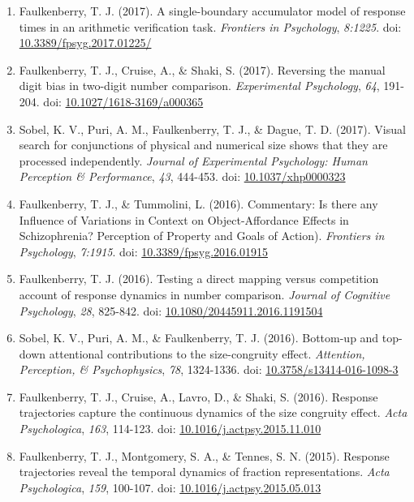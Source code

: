 \documentclass[article,10pt]{article}
\begin{document}
\begin{enumerate}
\item Faulkenberry, T. J. (2017). A single-boundary accumulator model of response times in an arithmetic verification task. \emph{Frontiers in Psychology}, \emph{8:1225}. doi: \href{http://dx.doi.org/10.3389/fpsyg.2017.01225}{10.3389/fpsyg.2017.01225/}
\item Faulkenberry, T. J., Cruise, A., \& Shaki, S. (2017). Reversing the manual digit bias in two-digit number comparison. \emph{Experimental Psychology}, \emph{64}, 191-204.  doi: \href{http://dx.doi.org/10.1027/1618-3169/a000365}{10.1027/1618-3169/a000365}
\item Sobel, K. V., Puri, A. M., Faulkenberry, T. J., \& Dague, T. D. (2017). Visual search for conjunctions of physical and numerical size shows that they are processed independently. \emph{Journal of Experimental Psychology: Human Perception \& Performance}, \emph{43}, 444-453. doi: \href{http://dx.doi.org/10.1037/xhp0000323}{10.1037/xhp0000323}
\item Faulkenberry, T. J., \& Tummolini, L. (2016). Commentary: Is there any Influence of Variations in Context on Object-Affordance Effects in Schizophrenia? Perception of Property and Goals of Action). \emph{Frontiers in Psychology}, \emph{7:1915}. doi: \href{http://dx.doi.org/10.3389/fpsyg.2016.01915}{10.3389/fpsyg.2016.01915}
\item Faulkenberry, T. J. (2016). Testing a direct mapping versus competition account of response dynamics in number comparison. \emph{Journal of Cognitive Psychology}, \emph{28}, 825-842. doi: \href{http://dx.doi.org/10.1080/20445911.2016.1191504}{10.1080/20445911.2016.1191504}
\item Sobel, K. V., Puri, A. M., \& Faulkenberry, T. J. (2016). Bottom-up and top-down attentional contributions to the size-congruity effect. \emph{Attention, Perception, \& Psychophysics}, \emph{78}, 1324-1336. doi: \href{http://dx.doi.org/10.3758/s13414-016-1098-3}{10.3758/s13414-016-1098-3}
\item Faulkenberry, T. J., Cruise, A., Lavro, D., \& Shaki, S. (2016). Response trajectories capture the continuous dynamics of the size congruity effect. \emph{Acta Psychologica}, \emph{163}, 114-123. doi: \href{http://dx.doi.org/10.1016/j.actpsy.2015.11.010}{10.1016/j.actpsy.2015.11.010}
\item Faulkenberry, T. J., Montgomery, S. A., \& Tennes, S. N. (2015). Response trajectories reveal the temporal dynamics of fraction representations. \emph{Acta Psychologica}, \emph{159}, 100-107. doi: \href{http://dx.doi.org/10.1016/j.actpsy.2015.05.013}{10.1016/j.actpsy.2015.05.013}

\end{enumerate}
\end{document}
